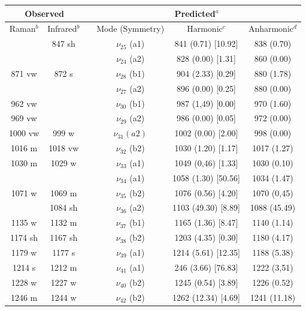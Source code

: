 	\begin{table}[H]
		\begin{center}
				\begin{threeparttable}
			\begin{tabular}{c c c c c c}
				\hline
				\multicolumn{ 2}{c}{Observed} & \multicolumn{1}{c}{} & \multicolumn{ 3}{c}{Predicted$^{a}$} \\ \hline
				Raman$^{b}$ & \multicolumn{1}{c}{Infrared$^{b}$} &  & \multicolumn{1}{c}{Mode (Symmetry)} & \multicolumn{1}{c}{Harmonic$^{c}$} & Anharmonic$^{d}$ \\ \hline
					& 847 sh & &$\nu_{25}$ (a1) & 841 (0.71) [10.92] & 838 (0.70) \\ 
					&  & & $\nu_{24}$ (a2) & 828 (0.00) [1.31] & 860 (0.00) \\ 
871 vw & 872 s & &$\nu_{28}$ (b1) & 904 (2.33) [0.29] & 880 (1.78) \\
&  & &$\nu_{27}$ (a2) & 896 (0.00) [0.25] & 880 (0.00) \\ 
962 vw &  & &$\nu_{30}$ (b1)& 987 (1,49) [0.00] & 970 (1.60) \\ 
	969 vw &  & &$\nu_{29} $ (a2) & 986 (0.00) [0.05] & 972 (0.00) \\ 
 1000 vw&999 w & &$\nu_{31} (a2)$ & 1002 (0.00) [2.00] & 998 (0.00) \\ 
	1016 m & 1018 vw& &$\nu_{32}$ (b2) & 1030 (1.20) [1.17] & 1017 (1.27) \\ 
1030 m	& 1029 w & &$\nu_{33}$ (a1) & 1049 (0,46) [1.33] & 1030 (0.10) \\ 
	 & & &$\nu_{34}$ (a1) & 1058 (1.30) [50.56] & 1034 (1.47) \\ 
1071 w	& 1069 m & &$\nu_{35}$ (b2) & 1076 (0.56) [4.20] & 1070 (0,45) \\ 
 &1084 sh & &$\nu_{36}$ (a2) & 1103 (49.30) [8.89] &  1088 (45.49) \\ 
	1135 w &1132 m 	& &$\nu_{37}$ (b1) & 1165 (1.36) [8.47] & 1140 (1.14)	\\ 
	1174 sh &1167 sh	& &$\nu_{38}$ (b2) & 1203 (4.35) [0.30] &  	1180 (4.17) \\
	1179 w & 1177 s &  &  $\nu_{39}$ (a1) & 1214 (5.61) [12.35] & 1188 (5.38)\\
	1214 s & 1212 m         
	&  & \multicolumn{1}{c}{$\nu_{41}$ (a1)} & 246 (3.66) [76.83] & 
	1222 (3,51) \\ 
	1228 w & 1227 w &  & \multicolumn{1}{c}{$\nu_{40}$ (b2)} & 1245 (0.54) [3.89] & 1226 (0.52) \\ 
	1246 m & 1244 w&  & \multicolumn{1}{c}{$\nu_{42}$ (b2)} & 1262 (12.34) [4.69]&   1241 (11.18)

\end{tabular}
\end{threeparttable}
\end{center}
\end{table}
